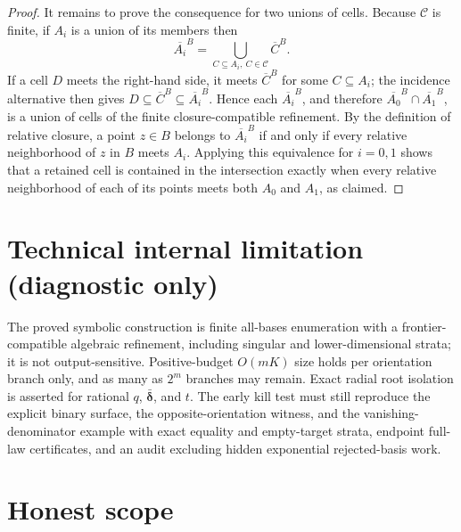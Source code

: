 \documentclass{article}
\begin{document}
\begin{proof}
It remains to prove the consequence for two unions of cells.  Because \(\mathscr C\) is finite, if \(A_i\) is a union of its members then
\[
\overline{A_i}^{B}
=\bigcup_{C\subseteq A_i,\ C\in\mathscr C}\overline C^{B}.
\]
If a cell \(D\) meets the right-hand side, it meets \(\overline C^{B}\) for some \(C\subseteq A_i\); the incidence alternative then gives \(D\subseteq\overline C^{B}\subseteq\overline{A_i}^{B}\).  Hence each \(\overline{A_i}^{B}\), and therefore \(\overline{A_0}^{B}\cap\overline{A_1}^{B}\), is a union of cells of the finite closure-compatible refinement.  By the definition of relative closure, a point \(z\in B\) belongs to \(\overline{A_i}^{B}\) if and only if every relative neighborhood of \(z\) in \(B\) meets \(A_i\).  Applying this equivalence for \(i=0,1\) shows that a retained cell is contained in the intersection exactly when every relative neighborhood of each of its points meets both \(A_0\) and \(A_1\), as claimed.
\end{proof}

\section*{Technical internal limitation (diagnostic only)}

The proved symbolic construction is finite all-bases enumeration with a frontier-compatible algebraic refinement, including singular and lower-dimensional strata; it is not output-sensitive. Positive-budget \(O(mK)\) size holds per orientation branch only, and as many as \(2^m\) branches may remain. Exact radial root isolation is asserted for rational \(q\), \(\bar{\boldsymbol\delta}\), and \(t\). The early kill test must still reproduce the explicit binary surface, the opposite-orientation witness, and the vanishing-denominator example with exact equality and empty-target strata, endpoint full-law certificates, and an audit excluding hidden exponential rejected-basis work.

\section{Honest scope}
\end{document}
